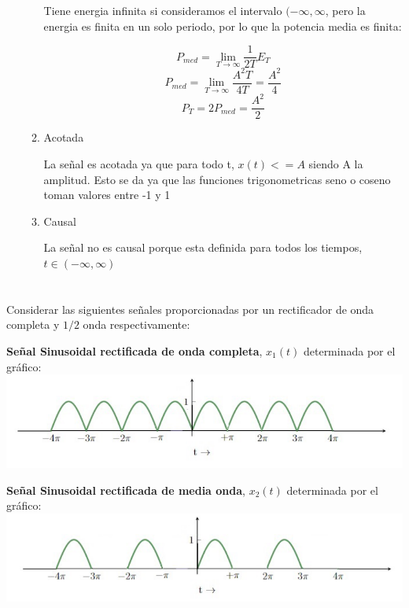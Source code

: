 \documentclass[12pt,a4paper]{report}
\begin{document}
\begin{enumerate}[label=\alph*),left=0pt]
\begin{enumerate}[label=\alph*)]
    Tiene energia infinita si consideramos el intervalo $(-\infty,\infty$, pero la energia es finita en un solo periodo,
    por lo que la potencia media es finita:

    $$P_{med} = \lim_{T \to \infty} \frac{1}{2T} E_T$$
    $$P_{med} = \lim_{T \to \infty} \frac{A^2T}{4T} = \frac{A^2}{4}$$
    $$P_T = 2 P_{med} = \frac{A^2}{2}$$
    \item Acotada

    La señal es acotada ya que para todo t, $x(t) <= A$ siendo A la amplitud. Esto se da ya que las funciones
    trigonometricas seno o coseno toman valores entre -1 y 1
    \item Causal

    La señal no es causal porque esta definida para todos los tiempos, $t \in (-\infty,\infty)$
  \end{enumerate}
\end{enumerate}

\chapter{}%
Considerar las siguientes señales proporcionadas por un rectificador de onda completa y $1/2$ onda respectivamente:

\textbf{Señal Sinusoidal rectificada de onda completa}, $x_1(t)$ determinada por el gráfico:
\includegraphics[width=\textwidth]{images/ej2.a.png}

\textbf{Señal Sinusoidal rectificada de media onda}, $x_2(t)$ determinada por el gráfico:
\includegraphics[width=\textwidth]{images/ej2.b.png}
\end{document}
